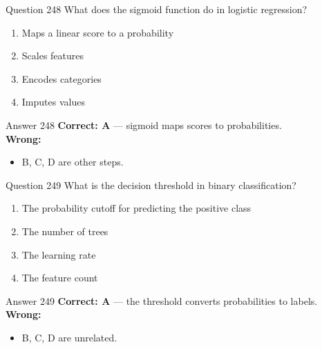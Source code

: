 \documentclass[aspectratio=169,11pt]{beamer}
\begin{document}
	\begin{frame}{Question 248}
		What does the sigmoid function do in logistic regression?
		\begin{enumerate}[label=\Alph*.]
			\item Maps a linear score to a probability
			\item Scales features
			\item Encodes categories
			\item Imputes values
		\end{enumerate}
	\end{frame}
	\begin{frame}{Answer 248}
		\textbf{Correct: A} --- sigmoid maps scores to probabilities.\\
		\vspace{0.5em}
		\textbf{Wrong:}
		\begin{itemize}
			\item B, C, D are other steps.
		\end{itemize}
	\end{frame}
	
	\begin{frame}{Question 249}
		What is the decision threshold in binary classification?
		\begin{enumerate}[label=\Alph*.]
			\item The probability cutoff for predicting the positive class
			\item The number of trees
			\item The learning rate
			\item The feature count
		\end{enumerate}
	\end{frame}
	\begin{frame}{Answer 249}
		\textbf{Correct: A} --- the threshold converts probabilities to labels.\\
		\vspace{0.5em}
		\textbf{Wrong:}
		\begin{itemize}
			\item B, C, D are unrelated.
		\end{itemize}
	\end{frame}
	
\end{document}
